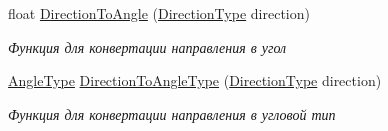 \begin{Indent}
\begin{DoxyCompactItemize}
float \hyperlink{namespacertm_a173759dd130d0f30d1f90fba11506bd6}{Direction\+To\+Angle} (\hyperlink{namespacertm_a57b216f3aeb45041f3461bab08bc3aeb}{Direction\+Type} direction)
\begin{DoxyCompactList}\small\item\em Функция для конвертации направления в угол \end{DoxyCompactList}\item 
\hyperlink{namespacertm_a69dc82b16a0148c10962caa83d930f89}{Angle\+Type} \hyperlink{namespacertm_aa37fca29e3577b3389a9e8eb40d20d14}{Direction\+To\+Angle\+Type} (\hyperlink{namespacertm_a57b216f3aeb45041f3461bab08bc3aeb}{Direction\+Type} direction)
\begin{DoxyCompactList}\small\item\em Функция для конвертации направления в угловой тип \end{DoxyCompactList}\end{DoxyCompactItemize}
\end{Indent}
